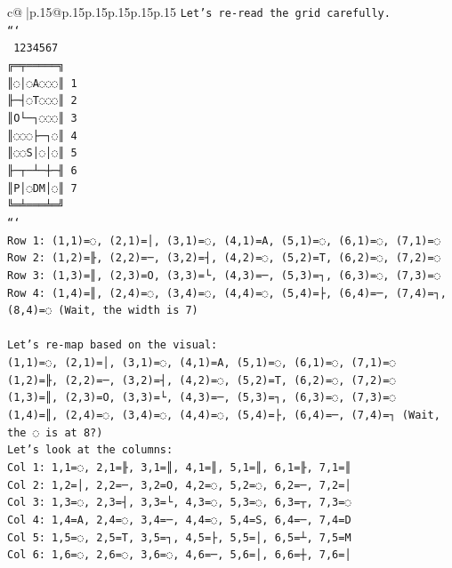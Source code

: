 \documentclass{article}
\begin{document}
{\begin{supertabular}{c@{$\;$}|p{.15\linewidth}@{}p{.15\linewidth}p{.15\linewidth}p{.15\linewidth}p{.15\linewidth}p{.15\linewidth}}
{{{\texttt{Let's re{-}read the grid carefully.} \\
\texttt{```} \\
\texttt{ 1234567} \\
\texttt{╔═╤═════╗} \\
\texttt{║◌│◌A◌◌◌║ 1} \\
\texttt{╟─┤◌T◌◌◌║ 2} \\
\texttt{║O└─┐◌◌◌║ 3} \\
\texttt{║◌◌◌├─┐◌║ 4} \\
\texttt{║◌◌S│◌│◌║ 5} \\
\texttt{╟─┬─┴─┼─╢ 6} \\
\texttt{║P│◌DM│◌║ 7} \\
\texttt{╚═╧═══╧═╝} \\
\texttt{```} \\
\texttt{Row 1: (1,1)=◌, (2,1)=│, (3,1)=◌, (4,1)=A, (5,1)=◌, (6,1)=◌, (7,1)=◌} \\
\texttt{Row 2: (1,2)=╟, (2,2)=─, (3,2)=┤, (4,2)=◌, (5,2)=T, (6,2)=◌, (7,2)=◌} \\
\texttt{Row 3: (1,3)=║, (2,3)=O, (3,3)=└, (4,3)=─, (5,3)=┐, (6,3)=◌, (7,3)=◌} \\
\texttt{Row 4: (1,4)=║, (2,4)=◌, (3,4)=◌, (4,4)=◌, (5,4)=├, (6,4)=─, (7,4)=┐, (8,4)=◌ (Wait, the width is 7)} \\
\\ 
\texttt{Let's re{-}map based on the visual:} \\
\texttt{(1,1)=◌, (2,1)=│, (3,1)=◌, (4,1)=A, (5,1)=◌, (6,1)=◌, (7,1)=◌} \\
\texttt{(1,2)=╟, (2,2)=─, (3,2)=┤, (4,2)=◌, (5,2)=T, (6,2)=◌, (7,2)=◌} \\
\texttt{(1,3)=║, (2,3)=O, (3,3)=└, (4,3)=─, (5,3)=┐, (6,3)=◌, (7,3)=◌} \\
\texttt{(1,4)=║, (2,4)=◌, (3,4)=◌, (4,4)=◌, (5,4)=├, (6,4)=─, (7,4)=┐ (Wait, the ◌ is at 8?)} \\
\texttt{Let's look at the columns:} \\
\texttt{Col 1: 1,1=◌, 2,1=╟, 3,1=║, 4,1=║, 5,1=║, 6,1=╟, 7,1=║} \\
\texttt{Col 2: 1,2=│, 2,2=─, 3,2=O, 4,2=◌, 5,2=◌, 6,2=─, 7,2=│} \\
\texttt{Col 3: 1,3=◌, 2,3=┤, 3,3=└, 4,3=◌, 5,3=◌, 6,3=┬, 7,3=◌} \\
\texttt{Col 4: 1,4=A, 2,4=◌, 3,4=─, 4,4=◌, 5,4=S, 6,4=─, 7,4=D} \\
\texttt{Col 5: 1,5=◌, 2,5=T, 3,5=┐, 4,5=├, 5,5=│, 6,5=┴, 7,5=M} \\
\texttt{Col 6: 1,6=◌, 2,6=◌, 3,6=◌, 4,6=─, 5,6=│, 6,6=┼, 7,6=│} \\
}}}
\end{supertabular}}
\end{document}
